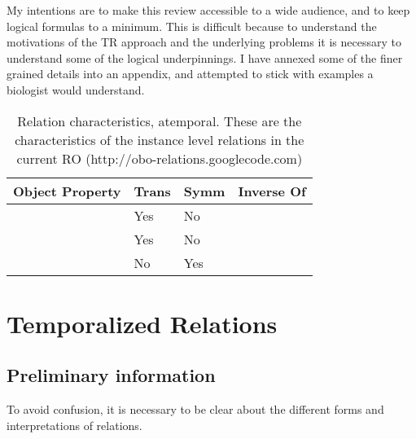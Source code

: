 \documentclass{bioinfo}
\def\partOf{\pr{part\_of}}
\def\hasPart{\pr{has\_part}}
\def\adjacentTo{\pr{adjacent\_to}}
\begin{document}
My intentions are to make this review accessible to a wide audience,
and to keep logical formulas to a minimum. This is difficult because
to understand the motivations of the TR approach and the underlying
problems it is necessary to understand some of the logical
underpinnings. I have annexed some of the finer grained details into
an appendix, and attempted to stick with examples a biologist would
understand.

\begin{table}
\begin{tabular}{ | p{2.5cm} | p{1cm} | p{1cm} | p{2cm} | }
\hline
\textbf{Object Property} & \textbf{Trans} & \textbf{Symm} & \textbf{Inverse Of}  \\
\hline
\partOf\  & Yes & No & \hasPart  \\
\hline
\hasPart\ & Yes & No & \partOf \\
\hline
\adjacentTo\ & No & Yes &  \\
\hline
\end{tabular}
\caption{Relation characteristics, atemporal. These are the characteristics of the instance level relations in the current RO (http://obo-relations.googlecode.com)}
\label{tab:characteristics-atemporal}
\end{table}

\section{Temporalized Relations}

\subsection{Preliminary information}

To avoid confusion, it is necessary to be clear about the different
forms and interpretations of relations.
\end{document}
